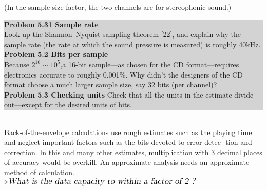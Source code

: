\documentclass{book}
\begin{document}

\large\textrm{(In the sample-size factor, the two channels are for stereophonic sound.)}
\\ 
 
\colorbox{lightgray}{
\begin{minipage}{\textwidth}
\large\textbf{Problem 5.31  Sample rate} \\ 
\textmd{Look  up  the  Shannon–Nyquist  sampling  theorem  [22],  and  explain  why  the sample rate (the rate at which the sound pressure is measured) is roughly
40kHz.}\\

\large\textbf{Problem  5.2 Bits per sample} \\
\large\textmd{Because $2^{16}\sim10^{5}$,a 16-bit  sample—as  chosen  for  the  CD  format—requires electronics  accurate  to  roughly 0.001\%.  Why  didn’t  the  designers  of  the  CD format choose a much larger sample size, say 32 bits (per channel)?}\\

\large\textbf{Problem 5.3 Checking units}
\textmd{Check that all the units in the estimate divide out—except for the desired units of bits.}
\end{minipage}}\\

{Back-of-the-envelope calculations use rough estimates such as the playing
time and neglect important factors such as the bits devoted to error detec-
tion and correction.  In this and many other estimates, multiplication with
3 decimal places of accuracy would be overkill.  An approximate analysis
needs an approximate method of calculation.}\\

$\triangleright\large\textsl{What is the data capacity to within a factor of 2 ?}\\$
\end{document}
